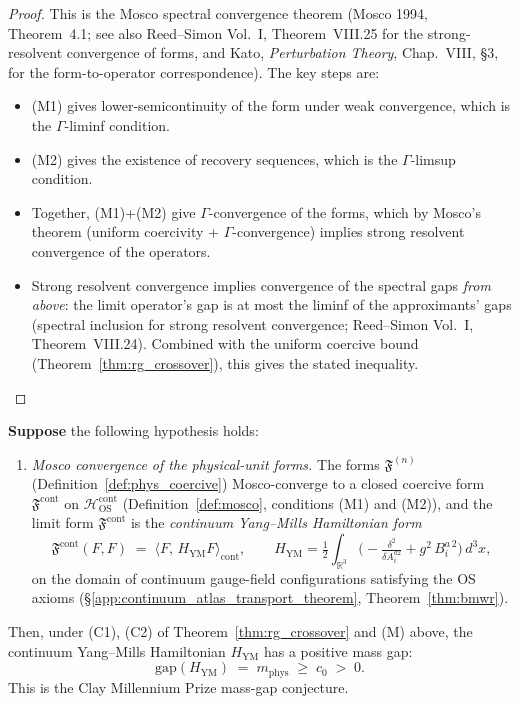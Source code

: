 \begin{proof}
This is the Mosco spectral convergence theorem (Mosco 1994,
Theorem~4.1; see also Reed--Simon Vol.~I, Theorem~VIII.25 for the
strong-resolvent convergence of forms, and Kato,
\emph{Perturbation Theory}, Chap.~VIII, §3, for the
form-to-operator correspondence). The key steps are:
\begin{itemize}
\item (M1) gives lower-semicontinuity of the form under weak
convergence, which is the $\Gamma$-liminf condition.
\item (M2) gives the existence of recovery sequences, which is the
$\Gamma$-limsup condition.
\item Together, (M1)+(M2) give $\Gamma$-convergence of the forms,
which by Mosco's theorem (uniform coercivity + $\Gamma$-convergence)
implies strong resolvent convergence of the operators.
\item Strong resolvent convergence implies convergence of the
spectral gaps \emph{from above}: the limit operator's gap is at
most the liminf of the approximants' gaps (spectral inclusion for
strong resolvent convergence; Reed--Simon Vol.~I,
Theorem~VIII.24). Combined with the uniform coercive bound
(Theorem~\ref{thm:rg_crossover}), this gives the stated
inequality.
\end{itemize}
\end{proof}

\begin{theorem}
\label{thm:mosco_id}
\textbf{Suppose} the following hypothesis holds:
\begin{enumerate}
\item[\textbf{(M)}] \emph{Mosco convergence of the physical-unit
forms.} The forms
$\mathfrak{F}^{(n)}$ (Definition~\ref{def:phys_coercive})
Mosco-converge to a closed coercive form
$\mathfrak{F}^{\mathrm{cont}}$ on
$\mathcal{H}_{\mathrm{OS}}^{\mathrm{cont}}$
(Definition~\ref{def:mosco}, conditions (M1) and (M2)), and the
limit form $\mathfrak{F}^{\mathrm{cont}}$ is the
\emph{continuum Yang--Mills Hamiltonian form}
\[
  \mathfrak{F}^{\mathrm{cont}}(F,F)
  \;=\;\langle F,\,H_{\mathrm{YM}}F\rangle_{\mathrm{cont}},
  \qquad
  H_{\mathrm{YM}}=\tfrac{1}{2}\int_{\mathbb{R}^{3}}\!
  \bigl(-\tfrac{\delta^{2}}{\delta A_{i}^{a 2}}
  +g^{2}\,B_{i}^{a\,2}\bigr)\,d^{3}x,
\]
on the domain of continuum gauge-field configurations satisfying
the OS axioms (\S\ref{app:continuum_atlas_transport_theorem},
Theorem~\ref{thm:bmwr}).
\end{enumerate}
Then, under (C1), (C2) of Theorem~\ref{thm:rg_crossover} and (M)
above, the continuum Yang--Mills Hamiltonian $H_{\mathrm{YM}}$ has
a positive mass gap:
\begin{equation}
\label{eq:clay_conclusion_spf}
  \mathrm{gap}(H_{\mathrm{YM}})
  \;=\;m_{\mathrm{phys}}
  \;\ge\;c_{0}\;>\;0.
\end{equation}
This is the Clay Millennium Prize mass-gap conjecture.
\end{theorem}


